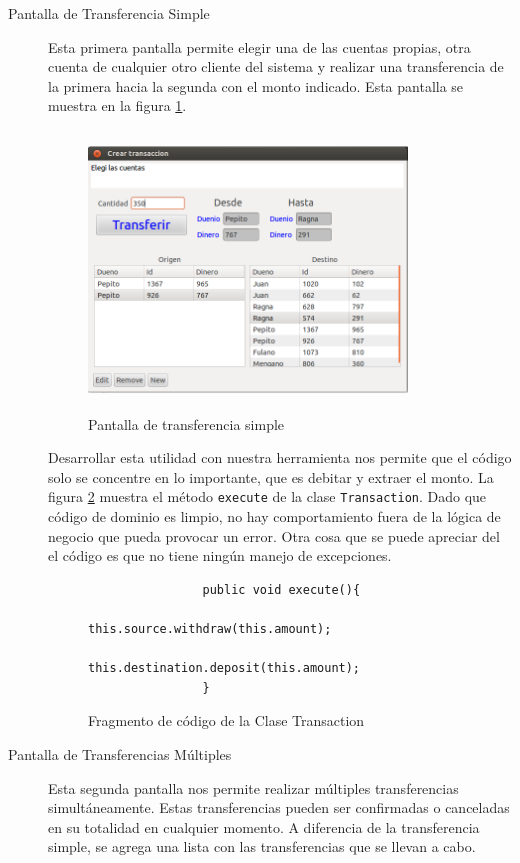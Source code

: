 \begin{description}

	\item[Pantalla de Transferencia Simple]
		Esta primera pantalla permite elegir una de las cuentas propias, otra cuenta
		de cualquier otro cliente del sistema y realizar una transferencia de la
		primera hacia la segunda con el monto indicado. Esta pantalla se
		muestra en la figura \ref{trasferenciaSimple}.
		
		\begin{figure}[h]
			\centering
			\includegraphics[width=320px, height=280px]{img/simple-transferencia}
			\caption{Pantalla de transferencia simple}
			\label{trasferenciaSimple}
		\end{figure}

		Desarrollar esta utilidad con nuestra herramienta nos permite que el código
		solo se concentre en lo importante, que es debitar y extraer el monto. 
		La figura \ref{executeTransaction} muestra el método  \lstinline|execute| de la
		clase \lstinline|Transaction|. 
		Dado que código de dominio es limpio, no hay comportamiento fuera de la lógica
		de negocio que pueda provocar un error. Otra cosa que se puede apreciar del el
		código es que no tiene ningún manejo de excepciones.

		\begin{figure}[h]
			\begin{lstlisting}
				public void execute(){
					this.source.withdraw(this.amount);
					this.destination.deposit(this.amount);
				}
			\end{lstlisting}
			\caption{Fragmento de código de la Clase Transaction}
			\label{executeTransaction}
		\end{figure}
		 
		
	\item[Pantalla de Transferencias Múltiples]
		Esta segunda pantalla nos permite realizar múltiples transferencias
		simultáneamente.
		Estas transferencias pueden ser confirmadas o canceladas en su totalidad en
		cualquier momento.
		A diferencia de la transferencia simple, se agrega una
		lista con las transferencias que se llevan a cabo.
	

\end{description}

